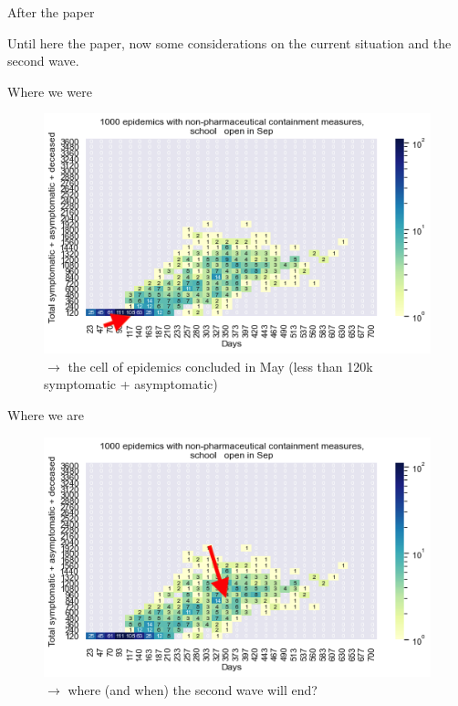 \documentclass[8pt]{beamer}
\begin{document}
\begin{frame}{After the paper}

Until here the paper, now some considerations on the current situation and the second wave.

\end{frame}
\begin{frame}{Where we were}

\begin{figure}[H]
\center
\includegraphics[scale=0.55]{WhereWeWere.png}

\caption{$\rightarrow$ the cell of epidemics concluded in May (less than 120k symptomatic + asymptomatic)} 
\label{WhereWeWere}
\end{figure}
\end{frame}

\begin{frame}{Where we are}

\begin{figure}[H]
\center
\includegraphics[scale=0.55]{WhereWeAre.png}

\caption{$\rightarrow$ where (and when) the second wave will end?} 
\label{WhereWeAre}
\end{figure}

\end{frame}
\end{document}

